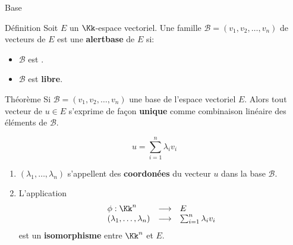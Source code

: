 \documentclass[dvipsnames]{beamer}
\begin{document}
\begin{frame}{Base}
 \begin{block}{Définition}
   \scriptsize
   Soit $E$ un $\Kk$-espace vectoriel. Une famille $\mathcal{B}=(v_1, v_2,
   \ldots, v_n)$ de vecteurs de $E$ est une \textbf{alert{base}} de $E$ si:
   \begin{itemize}
     \item $\mathcal{B}$ est .\\[2pt]
   \item $\mathcal{B}$ est \alert{\textbf{libre}}.
   \end{itemize}
 \end{block}
 \pause
 \newcommand{\base}{\mathcal{B}}
 \begin{block}{Théorème}
   \scriptsize
   Si $\base = (v_1, v_2,\ldots, v_n)$ une base de l'espace vectoriel $E$.
   Alors tout vecteur de $u \in E$ s'exprime de façon
   \textbf{\alert{unique}} comme combinaison linéaire des éléments de
   $\base$.

   \begin{equation}
     \label{eq:base}
      u = \sum_{i=1}^n \lambda_i v_i
   \end{equation}
 \end{block}
 \scriptsize

 \begin{enumerate}
   \item $(\lambda_1, \ldots,\lambda_n)$ s'appellent des
     \textbf{\alert{coordonées}}  du vecteur $u$ dans la base
     $\base$.\\[4pt]
    \item L'application 
      \begin{equation*}
        \begin{array}{lll}
          \phi : \Kk^n & \longrightarrow & E\\
          (\lambda_1,\ldots,\lambda_n) &\longrightarrow & \sum_{i=1}^n
          \lambda_i v_i
        \end{array}
      \end{equation*}
      est un \textbf{isomorphisme}  entre $\Kk^n$ et $E$.
 \end{enumerate}

\end{frame}
\end{document}
